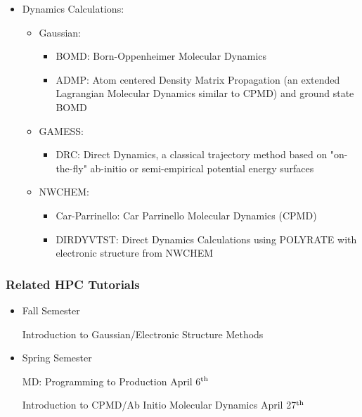 \documentclass[slidestop,mathserif,compress,xcolor=svgnames]{beamer}
\begin{document}
\begin{frame}[allowframebreaks]
{\begin{alertblock}{}
\begin{itemize}
\item Dynamics Calculations:
\begin{itemize}
\item Gaussian:
 \begin{itemize}
 \item BOMD: Born-Oppenheimer Molecular Dynamics
 \item ADMP: Atom centered Density Matrix Propagation (an extended Lagrangian Molecular Dynamics similar to CPMD) and ground state BOMD
 \end{itemize}
\item GAMESS:
  \begin{itemize}
  \item DRC: Direct Dynamics, a classical trajectory method based on "on-the-fly" ab-initio or semi-empirical potential energy surfaces
  \end{itemize}
\item NWCHEM:
  \begin{itemize}
  \item Car-Parrinello: Car Parrinello Molecular Dynamics (CPMD)
  \item DIRDYVTST: Direct Dynamics Calculations using POLYRATE with electronic structure from NWCHEM
  \end{itemize}
\end{itemize}
\end{itemize}
\end{alertblock}
}
\end{frame}

\begin{frame}
\frametitle{\small Related HPC Tutorials}
\begin{itemize}
\item Fall Semester
\begin{block}{Introduction to Gaussian/Electronic Structure Methods}
\end{block}
\item Spring Semester
\begin{alertblock}{MD: Programming to Production}
April 6$^{\rm th}$
\end{alertblock}
\begin{alertblock}{Introduction to CPMD/Ab Initio Molecular Dynamics}
April 27$^{\rm th}$
\end{alertblock}
\end{itemize}
\end{frame}
\end{document}
